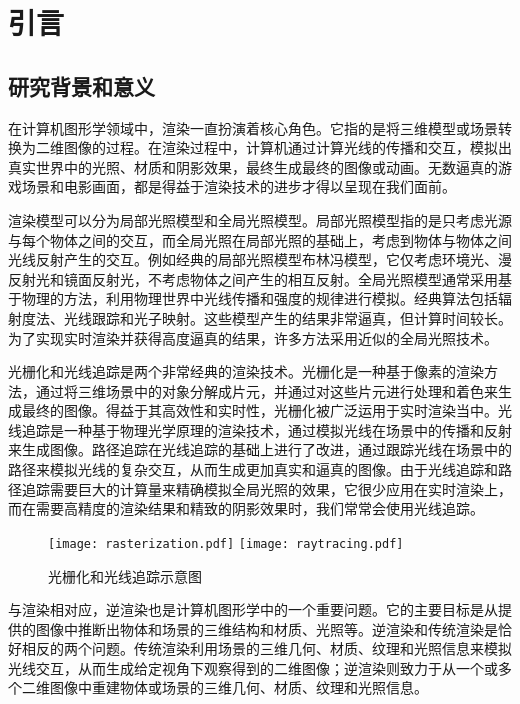 
\chapter{引言}

\section{研究背景和意义}

在计算机图形学领域中，渲染一直扮演着核心角色。它指的是将三维模型或场景转换为二维图像的过程。在渲染过程中，计算机通过计算光线的传播和交互，模拟出真实世界中的光照、材质和阴影效果，最终生成最终的图像或动画。无数逼真的游戏场景和电影画面，都是得益于渲染技术的进步才得以呈现在我们面前。

渲染模型可以分为局部光照模型和全局光照模型。局部光照模型指的是只考虑光源与每个物体之间的交互，而全局光照在局部光照的基础上，考虑到物体与物体之间光线反射产生的交互。例如经典的局部光照模型布林冯模型，它仅考虑环境光、漫反射光和镜面反射光，不考虑物体之间产生的相互反射。全局光照模型通常采用基于物理的方法，利用物理世界中光线传播和强度的规律进行模拟。经典算法包括辐射度法、光线跟踪和光子映射。这些模型产生的结果非常逼真，但计算时间较长。为了实现实时渲染并获得高度逼真的结果，许多方法采用近似的全局光照技术。

光栅化和光线追踪是两个非常经典的渲染技术。光栅化是一种基于像素的渲染方法，通过将三维场景中的对象分解成片元，并通过对这些片元进行处理和着色来生成最终的图像。得益于其高效性和实时性，光栅化被广泛运用于实时渲染当中。光线追踪是一种基于物理光学原理的渲染技术，通过模拟光线在场景中的传播和反射来生成图像。路径追踪在光线追踪的基础上进行了改进，通过跟踪光线在场景中的路径来模拟光线的复杂交互，从而生成更加真实和逼真的图像。由于光线追踪和路径追踪需要巨大的计算量来精确模拟全局光照的效果，它很少应用在实时渲染上，而在需要高精度的渲染结果和精致的阴影效果时，我们常常会使用光线追踪。

\begin{figure}[htbp]
  \centering
  \texttt{[image: rasterization.pdf]}
  \hspace{\fill}
  \texttt{[image: raytracing.pdf]}
  \caption{光栅化和光线追踪示意图}
  \label{fig:rasterization}
\end{figure}

与渲染相对应，逆渲染也是计算机图形学中的一个重要问题。它的主要目标是从提供的图像中推断出物体和场景的三维结构和材质、光照等。逆渲染和传统渲染是恰好相反的两个问题。传统渲染利用场景的三维几何、材质、纹理和光照信息来模拟光线交互，从而生成给定视角下观察得到的二维图像；逆渲染则致力于从一个或多个二维图像中重建物体或场景的三维几何、材质、纹理和光照信息。

